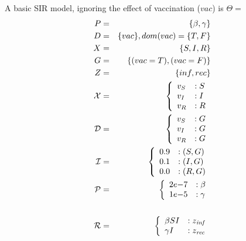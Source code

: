 \begin{example}\label{ex:base}
	A basic SIR model, ignoring the effect of vaccination ($vac$) is $\Theta =$
	\begin{eqnarray*}
		P &=& \{\beta, \gamma\}\\
		D &=& \{vac\}, dom(vac) = \{T, F\}\\
		X &=& \{S, I, R\}\\
		G &=& \{(vac=T), (vac=F)\}\\
		Z &=& \{inf, rec\}\\
		{\cal X} &=& \left\{
		\begin{array}{ll}
			v_S & :S \\
			v_I & :I \\
			v_R & :R
		\end{array}\right.\\
		{\cal D} &=& \left\{
		\begin{array}{ll}
			v_S & :G \\
			v_I & :G \\
			v_R & :G \\
		\end{array}\right.\\
		{\cal I} &=& \left\{
		\begin{array}{ll}
			0.9 & :(S, G) \\
			0.1 & :(I, G) \\
			0.0 & :(R, G)
		\end{array}\right.\\
		{\cal P}&=& \left\{
		\begin{array}{ll}
			2e{-7} & :\beta  \\
			1e{-5} & :\gamma
		\end{array}\right.\\
		\\
		{\cal R} &=& \left\{
		\begin{array}{ll}
			\beta S I & : z_{\mathit{inf}} \\
			\gamma I  & : z_{\mathit{rec}} \\
		\end{array}\right.\\
	\end{eqnarray*}
\end{example}

